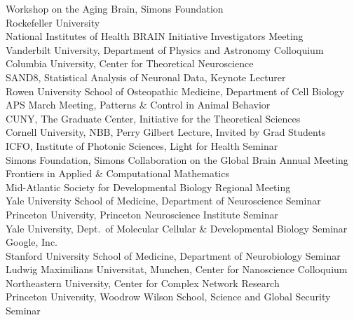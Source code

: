 \documentclass[11pt]{article}
\begin{document}
Workshop on the Aging Brain, Simons Foundation \\
Rockefeller University \\
National Institutes of Health BRAIN Initiative Investigators Meeting \\
Vanderbilt University, Department of Physics and Astronomy Colloquium \\
Columbia University, Center for Theoretical Neuroscience \\
SAND8, Statistical Analysis of Neuronal Data, Keynote Lecturer \\
Rowen University School of Osteopathic Medicine, Department of Cell Biology \\
APS March Meeting, Patterns \& Control in Animal Behavior \\
CUNY, The Graduate Center, Initiative for the Theoretical Sciences\\
Cornell University, NBB, Perry Gilbert Lecture, Invited by Grad Students\\
ICFO, Institute of Photonic Sciences, Light for Health Seminar  \\
Simons Foundation, Simons Collaboration on the Global Brain Annual Meeting  \\ 
Frontiers in Applied \& Computational Mathematics\\
Mid-Atlantic Society for Developmental Biology Regional Meeting \\
Yale University School of Medicine, Department of Neuroscience Seminar \\
Princeton University, Princeton Neuroscience Institute Seminar \\
Yale University, Dept.~of Molecular Cellular \& Developmental Biology Seminar \\
Google, Inc. \\
Stanford University School of Medicine, Department of Neurobiology Seminar \\
Ludwig Maximilians Universitat, Munchen, Center for Nanoscience Colloquium \\
Northeastern University, Center for Complex Network Research  \\ 
Princeton University, Woodrow Wilson School, Science and Global Security Seminar \\
\end{document}
